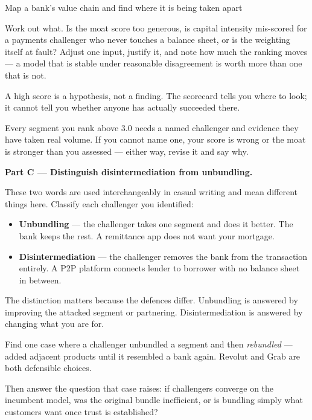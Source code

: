 \begin{labproject}{Map a bank's value chain and find where it is being taken apart}
\begin{tryit}
Work out what. Is the moat score too generous, is capital intensity mis-scored for a payments challenger who never touches a balance sheet, or is the weighting itself at fault? Adjust one input, justify it, and note how much the ranking moves --- a model that is stable under reasonable disagreement is worth more than one that is not.
\end{tryit}

\begin{pitfall}
A high score is a hypothesis, not a finding. The scorecard tells you where to look; it cannot tell you whether anyone has actually succeeded there.

Every segment you rank above 3.0 needs a named challenger and evidence they have taken real volume. If you cannot name one, your score is wrong or the moat is stronger than you assessed --- either way, revise it and say why.
\end{pitfall}

\medskip\noindent\textbf{Part C --- Distinguish disintermediation from unbundling.}\par
These two words are used interchangeably in casual writing and mean different things here. Classify each challenger you identified:

\begin{itemize}
  \item \textbf{Unbundling} --- the challenger takes one segment and does it better. The bank keeps the rest. A remittance app does not want your mortgage.
  \item \textbf{Disintermediation} --- the challenger removes the bank from the transaction entirely. A P2P platform connects lender to borrower with no balance sheet in between.
\end{itemize}

The distinction matters because the defences differ. Unbundling is answered by improving the attacked segment or partnering. Disintermediation is answered by changing what you are for.

\begin{tryit}
Find one case where a challenger unbundled a segment and then \emph{rebundled} --- added adjacent products until it resembled a bank again. Revolut and Grab are both defensible choices.

Then answer the question that case raises: if challengers converge on the incumbent model, was the original bundle inefficient, or is bundling simply what customers want once trust is established?
\end{tryit}
\end{labproject}

